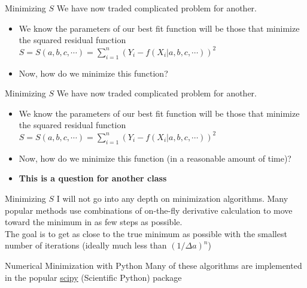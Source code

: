 \documentclass{beamer}
\begin{document}
\begin{frame}{Minimizing $S$}
	We have now traded complicated problem for another. 
	\begin{itemize}
		\item <2-> We know the parameters of our best fit function will be those that minimize the squared residual function $S=S(a,b,c,\cdots)=\sum_{i=1}^{n}\left(Y_i-f(X_i|a,b,c,\cdots)\right)^2$
		\item <3-> Now, how do we minimize this function?
	\end{itemize}
\end{frame}





\begin{frame}{Minimizing $S$}
	We have now traded complicated problem for another. 
	\begin{itemize}
		\item <2-> We know the parameters of our best fit function will be those that minimize the squared residual function $S=S(a,b,c,\cdots)=\sum_{i=1}^{n}\left(Y_i-f(X_i|a,b,c,\cdots)\right)^2$
		\item <3-> Now, how do we minimize this function (in a reasonable amount of time)?
		\item <4-> \textbf{This is a question for another class}
	\end{itemize}
\end{frame}



\begin{frame}{Minimizing $S$}
	I will not go into any depth on minimization algorithms. Many popular methods use combinations of on-the-fly derivative calculation to move toward the minimum in as few steps as possible. \\
	The goal is to get as close to the true minimum as possible with the smallest number of iterations (ideally much less than $(1/\Delta a)^n$)
\end{frame}



\begin{frame}{Numerical Minimization with Python}
	Many of these algorithms are implemented in the popular \href{https://www.scipy.org}{scipy} (Scientific Python) package 
\end{frame}
\end{document}
